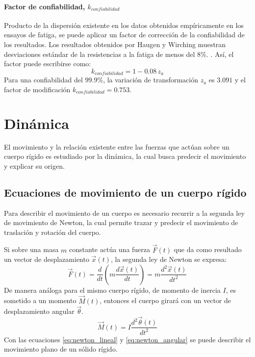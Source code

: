\paragraph{Factor de confiabilidad, $k_{confiabilidad}$}
Producto de la dispersión existente en los datos obtenidos empíricamente en los ensayos de fatiga, se puede aplicar un factor de corrección de la confiabilidad de los resultados. Los resultados obtenidos por Haugen y Wirching muestran desviaciones estándar de la resistencias a la fatiga de menos del 8\%. \cite{budynas2008shigley}. Así, el factor puede escribirse como:
\begin{equation}
	k_{confiabilidad} = 1 - 0.08\, z_a
\end{equation} 
Para una confiabilidad del $99.9\%$, la variación de transformación $z_a$ es $3.091$ y el factor de modificación $k_{confiabilidad} = 0.753$.

\section{Dinámica}

El movimiento y la relación existente entre las fuerzas que actúan sobre un cuerpo rígido es estudiado por la dinámica, la cual busca predecir el movimiento y explicar su origen. 

\subsection{Ecuaciones de movimiento de un cuerpo rígido}
\label{sec:ec_mov}
Para describir el movimiento de un cuerpo es necesario recurrir a la segunda ley de movimiento de Newton, la cual permite trazar y predecir el movimiento de traslación y rotación del cuerpo.

Si sobre una masa $m$ constante actúa una fuerza $\vec{F}(t)$ que da como resultado un vector de desplazamiento $\vec{x}(t)$, la segunda ley de Newton se expresa:
\begin{equation}\label{eq:newton_lineal}
	\vec{F}(t) = \frac{d}{dt}\left(m\frac{d\vec{x}(t)}{dt}\right) = m \frac{d^2\vec{x}(t)}{dt^2}
\end{equation}
De manera análoga para el mismo cuerpo rígido, de momento de inercia $I$, es sometido a un momento $\vec{M}(t)$, entonces el cuerpo girará con un vector de desplazamiento angular $\vec{\theta}$.
\begin{equation}\label{eq:newton_angular}
	\vec{M}(t) = I\frac{d^2\vec{\theta}(t)}{dt^2}
\end{equation} 
Con las ecuaciones \ref{eq:newton_lineal} y \ref{eq:newton_angular} se puede describir el movimiento plano de un sólido rígido.

